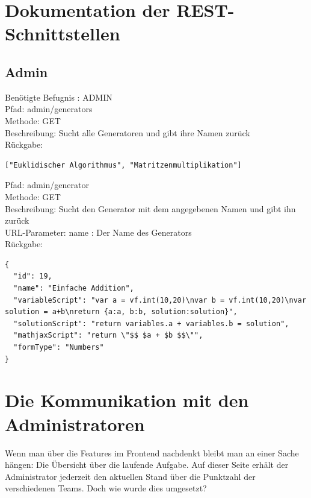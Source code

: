 \section{Dokumentation der REST-Schnittstellen}

\subsection{Admin}

Benötigte Befugnis : ADMIN \\

\noindent Pfad: admin/generators \\
Methode: GET \\
Beschreibung: Sucht alle Generatoren und gibt ihre Namen zurück \\
Rückgabe: \begin{lstlisting} 
["Euklidischer Algorithmus", "Matritzenmultiplikation"]
\end{lstlisting}

\noindent Pfad: admin/generator \\
Methode: GET \\
Beschreibung: Sucht den Generator mit dem angegebenen Namen und gibt ihn zurück \\
URL-Parameter: name : Der Name des Generators \\
Rückgabe: \begin{lstlisting} 
{
  "id": 19,
  "name": "Einfache Addition",
  "variableScript": "var a = vf.int(10,20)\nvar b = vf.int(10,20)\nvar solution = a+b\nreturn {a:a, b:b, solution:solution}",
  "solutionScript": "return variables.a + variables.b = solution",
  "mathjaxScript": "return \"$$ $a + $b $$\"",
  "formType": "Numbers"
}
\end{lstlisting}

\section{Die Kommunikation mit den Administratoren}

Wenn man über die Features im Frontend nachdenkt bleibt man an einer Sache hängen: Die Übersicht über die laufende Aufgabe. Auf dieser Seite erhält der Administrator jederzeit den aktuellen Stand über die Punktzahl der verschiedenen Teams. Doch wie wurde dies umgesetzt? \\

